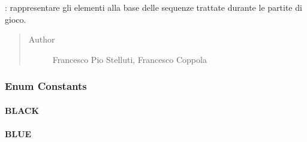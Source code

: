 \documentclass[letterpaper,10pt,italian,openany,oneside]{sphinxmanual}
\begin{document}
\begin{fulllineitems}
\label{\detokenize{test/it/unicam/cs/pa/mastermind/gamecore/ColorPegs:it.unicam.cs.pa.mastermind.gamecore.ColorPegs}}
: rappresentare gli elementi alla base delle sequenze trattate durante le partite di gioco.
\begin{quote}\begin{description}
\item[{Author}] \leavevmode
Francesco Pio Stelluti, Francesco Coppola

\end{description}\end{quote}

\end{fulllineitems}



\subsubsection{Enum Constants}
\label{\detokenize{test/it/unicam/cs/pa/mastermind/gamecore/ColorPegs:enum-constants}}

\paragraph{BLACK}
\label{\detokenize{test/it/unicam/cs/pa/mastermind/gamecore/ColorPegs:black}}

\begin{fulllineitems}
\label{\detokenize{test/it/unicam/cs/pa/mastermind/gamecore/ColorPegs:it.unicam.cs.pa.mastermind.gamecore.ColorPegs.BLACK}}
\end{fulllineitems}



\paragraph{BLUE}
\label{\detokenize{test/it/unicam/cs/pa/mastermind/gamecore/ColorPegs:blue}}

\begin{fulllineitems}
\label{\detokenize{test/it/unicam/cs/pa/mastermind/gamecore/ColorPegs:it.unicam.cs.pa.mastermind.gamecore.ColorPegs.BLUE}}
\end{fulllineitems}
\end{document}
